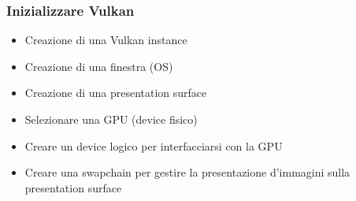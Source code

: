 \begin{frame}
\frametitle{Inizializzare Vulkan}

\begin{itemize}
\item Creazione di una Vulkan instance
\item Creazione di una finestra (OS)
\item Creazione di una presentation surface
\item Selezionare una GPU (device fisico)
\item Creare un device logico per interfacciarsi con la GPU
\item Creare una swapchain per gestire la presentazione d'immagini sulla presentation surface
\end{itemize}

\end{frame}
